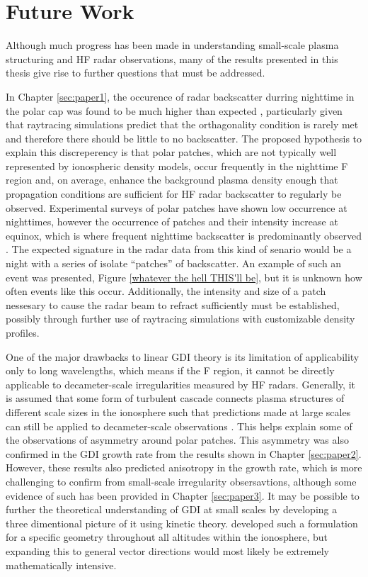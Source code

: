 \section{Future Work}
\label{sec:futurework}

Although much progress has been made in understanding small-scale plasma structuring and HF radar observations, many of the results presented in this thesis give rise to further questions that must be addressed.

In Chapter \ref{sec:paper1}, the occurence of radar backscatter durring nighttime in the polar cap was found to be much higher than expected \citep{Bristow2011}, particularly given that raytracing simulations predict that the orthagonality condition is rarely met and therefore there should be little to no backscatter.  The proposed hypothesis to explain this discreperency is that polar patches, which are not typically well represented by ionospheric density models, occur frequently in the nighttime F region and, on average, enhance the background plasma density enough that propagation conditions are sufficient for HF radar backscatter to regularly be observed.  Experimental surveys of polar patches have shown low occurrence at nighttimes, however the occurrence of patches and their intensity increase at equinox, which is where frequent nighttime backscatter is predominantly observed \citep{Rodger1996}.  The expected signature in the radar data from this kind of senario would be a night with a series of isolate ``patches'' of backscatter.  An example of such an event was presented, Figure \ref{whatever the hell THIS'll be}, but it is unknown how often events like this occur.  Additionally, the intensity and size of a patch nessesary to cause the radar beam to refract sufficiently must be established, possibly through further use of raytracing simulations with customizable density profiles.

One of the major drawbacks to linear GDI theory is its limitation of applicability only to long wavelengths, which means if the F region, it cannot be directly applicable to decameter-scale irregularities measured by HF radars.  Generally, it is assumed that some form of turbulent cascade connects plasma structures of different scale sizes in the ionosphere such that predictions made at large scales can still be applied to decameter-scale observations \citep{Tsunoda1988}.  This helps explain some of the observations of asymmetry around polar patches.  This asymmetry was also confirmed in the GDI growth rate from the results shown in Chapter \ref{sec:paper2}.  However, these results also predicted anisotropy in the growth rate, which is more challenging to confirm from small-scale irregularity obsersavtions, although some evidence of such has been provided in Chapter \ref{sec:paper3}.  It may be possible to further the theoretical understanding of GDI at small scales by developing a three dimentional picture of it using kinetic theory.  \citet{Basu1995} developed such a formulation for a specific geometry throughout all altitudes within the ionosphere, but expanding this to general vector directions would most likely be extremely mathematically intensive.


